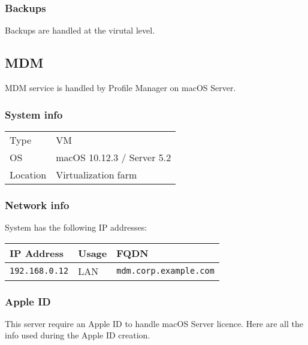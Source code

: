 \documentclass{demo}
\begin{document}
\subsubsection{Backups}

Backups are handled at the virutal level.

\subsection{MDM}

MDM service is handled by Profile Manager on macOS Server.

\subsubsection{System info}
\begin{tabularx}{\textwidth}{l|l}
 Type & VM \\
 OS & macOS 10.12.3 / Server 5.2 \\
 Location & Virtualization farm \\
\end{tabularx}

\subsubsection{Network info}

System has the following IP addresses:

\begin{tabularx}{\textwidth}{l|ll}
 IP Address & Usage & FQDN \\
 \hline\endhead
 \texttt{192.168.0.12} & LAN & \texttt{mdm.corp.example.com} \\
\end{tabularx}

\subsubsection{Apple ID}

This server require an Apple ID to handle macOS Server licence. Here are all the info used during the Apple ID creation.
\end{document}
